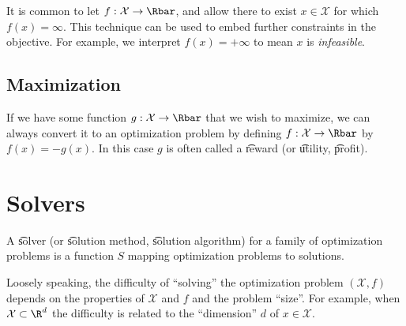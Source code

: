 It is common to let $f: \mathcal{X}  \to \Rbar$, and allow there to exist $x \in \mathcal{X} $ for which $f(x) = \infty$.
This technique can be used to embed further constraints in the objective.
For example, we interpret $f(x) = +\infty$ to mean $x$ is \textit{infeasible}.

\subsection*{Maximization}

If we have some function $g: \mathcal{X}  \to \Rbar$ that we wish to maximize, we can always convert it to an optimization problem by defining $f: \mathcal{X}  \to \Rbar$ by $f(x) = -g(x)$.
In this case $g$ is often called a \t{reward} (or \t{utility}, \t{profit}).

\section*{Solvers}

A \t{solver} (or \t{solution method}, \t{solution algorithm}) for a family of optimization problems is a function $S$ mapping optimization problems to solutions.

Loosely speaking, the difficulty of ``solving'' the optimization problem $(\mathcal{X} , f)$ depends on the properties of $\mathcal{X} $ and $f$ and the problem ``size''.
For example, when $\mathcal{X}  \subset \R ^d$ the difficulty is related to the ``dimension'' $d$ of $x \in \mathcal{X} $.

